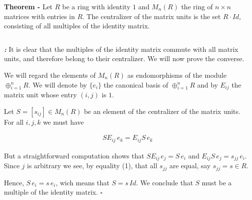 \documentclass[12pt]{article}
\begin{document}
{\bf Theorem -} Let $R$ be a ring with identity $1$ and $M_n(R)$ the ring of $n \times n$ matrices with entries in $R$. The centralizer of the matrix units is the set $R\cdot Id$, consisting of all multiples of the identity matrix.

$\,$

{\bf \emph{:}} It is clear that the multiples of the identity matrix commute with all matrix units, and therefore belong to their centralizer. We will now prove the converse.

We will regard the elements of $M_n(R)$ as endomorphisms of the module $\oplus_{i =1}^n R$. We will denote by $\{e_i\}$ the canonical basis of $\oplus_{i =1}^n R$ and by $E_{ij}$ the matrix unit whose entry $(i,j)$ is $1$.

Let $S = [s_{ij}] \in M_n(R)$ be an element of the centralizer of the matrix units. For all $i, j, k$ we must have

\begin{align}
SE_{ij}\, e_k = E_{ij}S\, e_k
\end{align}

But a straightforward computation shows that $SE_{ij\,}e_j = S\, e_i$ and $E_{ij}S\, e_j = s_{jj}\,e_i$. Since $j$ is arbitrary we see, by equality (1), that all $s_{jj}$ are equal, say $s_{jj} = s \in R$.

 Hence, $S\, e_i = s\, e_i$, wich means that $S = s\,Id$. We conclude that $S$ must be a multiple of the identity matrix. $\square$
\end{document}
